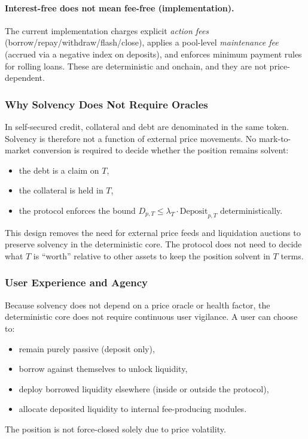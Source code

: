 \documentclass[version=preprint]{iacrcc}
\begin{document}
\paragraph{Interest-free does not mean fee-free (implementation).}
The current implementation charges explicit \emph{action fees} (borrow/repay/withdraw/flash/close), applies a pool-level \emph{maintenance fee} (accrued via a negative index on deposits), and enforces minimum payment rules for rolling loans. These are deterministic and onchain, and they are not price-dependent.

\subsubsection{Why Solvency Does Not Require Oracles}

In self-secured credit, collateral and debt are denominated in the same token. Solvency is therefore not a function of external price movements. No mark-to-market conversion is required to decide whether the position remains solvent:
\begin{itemize}
  \item the debt is a claim on $T$,
  \item the collateral is held in $T$,
  \item the protocol enforces the bound $D_{p,T} \le \lambda_T \cdot \text{Deposit}_{p,T}$ deterministically.
\end{itemize}

This design removes the need for external price feeds and liquidation auctions to preserve solvency in the deterministic core. The protocol does not need to decide what $T$ is ``worth'' relative to other assets to keep the position solvent in $T$ terms.

\subsubsection{User Experience and Agency}

Because solvency does not depend on a price oracle or health factor, the deterministic core does not require continuous user vigilance. A user can choose to:
\begin{itemize}
  \item remain purely passive (deposit only),
  \item borrow against themselves to unlock liquidity,
  \item deploy borrowed liquidity elsewhere (inside or outside the protocol),
  \item allocate deposited liquidity to internal fee-producing modules.
\end{itemize}
The position is not force-closed solely due to price volatility.
\end{document}
